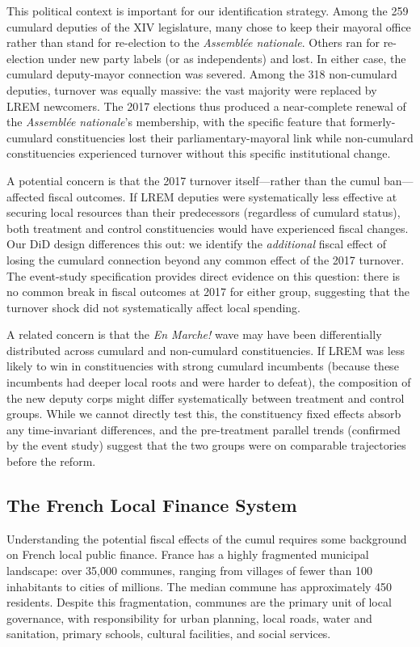 \documentclass[12pt]{article}
\begin{document}
This political context is important for our identification strategy. Among the 259 cumulard deputies of the XIV legislature, many chose to keep their mayoral office rather than stand for re-election to the \textit{Assemblée nationale}. Others ran for re-election under new party labels (or as independents) and lost. In either case, the cumulard deputy-mayor connection was severed. Among the 318 non-cumulard deputies, turnover was equally massive: the vast majority were replaced by LREM newcomers. The 2017 elections thus produced a near-complete renewal of the \textit{Assemblée nationale}'s membership, with the specific feature that formerly-cumulard constituencies lost their parliamentary-mayoral link while non-cumulard constituencies experienced turnover without this specific institutional change.

A potential concern is that the 2017 turnover itself---rather than the cumul ban---affected fiscal outcomes. If LREM deputies were systematically less effective at securing local resources than their predecessors (regardless of cumulard status), both treatment and control constituencies would have experienced fiscal changes. Our DiD design differences this out: we identify the \textit{additional} fiscal effect of losing the cumulard connection beyond any common effect of the 2017 turnover. The event-study specification provides direct evidence on this question: there is no common break in fiscal outcomes at 2017 for either group, suggesting that the turnover shock did not systematically affect local spending.

A related concern is that the \textit{En Marche!} wave may have been differentially distributed across cumulard and non-cumulard constituencies. If LREM was less likely to win in constituencies with strong cumulard incumbents (because these incumbents had deeper local roots and were harder to defeat), the composition of the new deputy corps might differ systematically between treatment and control groups. While we cannot directly test this, the constituency fixed effects absorb any time-invariant differences, and the pre-treatment parallel trends (confirmed by the event study) suggest that the two groups were on comparable trajectories before the reform.

\subsection{The French Local Finance System}

Understanding the potential fiscal effects of the cumul requires some background on French local public finance. France has a highly fragmented municipal landscape: over 35,000 communes, ranging from villages of fewer than 100 inhabitants to cities of millions. The median commune has approximately 450 residents. Despite this fragmentation, communes are the primary unit of local governance, with responsibility for urban planning, local roads, water and sanitation, primary schools, cultural facilities, and social services.
\end{document}
